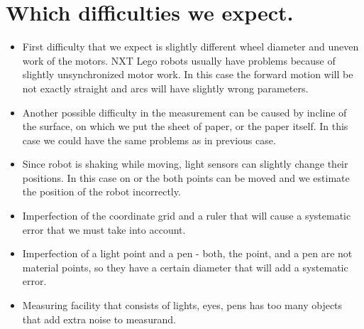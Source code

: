 \documentclass[a4paper, 12pt]{article}
\begin{document}
\section{Which difficulties we expect.}
\begin{itemize}
\item First difficulty that we expect is slightly different wheel diameter and uneven work of the motors. NXT Lego robots usually have problems because of slightly unsynchronized motor work. In this case the forward motion will be not exactly straight and arcs will have slightly wrong parameters.
\item Another possible difficulty in the measurement can be caused by incline of the surface, on which we put the sheet of paper, or the paper itself. In this case we could have the same problems as in previous case.
\item Since robot is shaking while moving, light sensors can slightly change their positions. In this case on or the both points can be moved and we estimate the position of the robot incorrectly.
\item Imperfection of the coordinate grid and a ruler that will cause a systematic error that we must take into account.
\item Imperfection of a light point and a pen - both, the point, and a pen are not material points, so they have a certain diameter that will add a systematic error.
\item Measuring facility that consists of lights, eyes, pens has too many objects that add extra noise to measurand.
\end{itemize}
\end{document}

